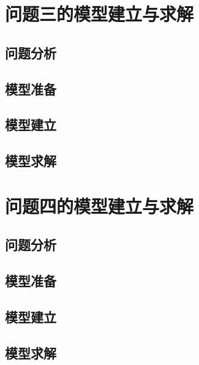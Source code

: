 \section{问题三的模型建立与求解}

\subsection{问题分析}
\subsection{模型准备}
\subsection{模型建立}
\subsection{模型求解}

\section{问题四的模型建立与求解}

\subsection{问题分析}
\subsection{模型准备}
\subsection{模型建立}
\subsection{模型求解}
